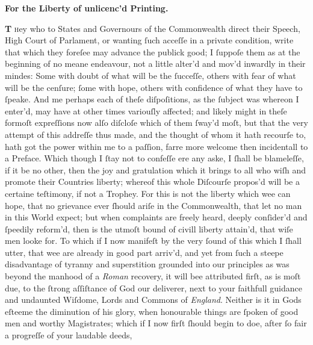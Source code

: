 \vspace*{\baselineskip}

\begin{center}
    \large\bfseries
    For the Liberty of unlicenc'd Printing.
\end{center}

\vspace{\baselineskip}

\lettrine[lines=3]{\bfseries T}{ h}ey who to States and Governours
of the Commonwealth direct their Speech, High Court of Parlament, or wanting
ſuch acceſſe in a private condition, write that which they foreſee may advance
the publick good; I ſuppoſe them as at the beginning of no meane endeavour, not
a little alter'd and mov'd inwardly in their mindes: Some with doubt of what
will be the ſucceſſe, others with fear of what will be the cenſure; ſome with
hope, others with confidence of what they have to ſpeake.  And me perhaps each
of theſe diſpoſitions, as the ſubject was whereon I enter'd, may have at other
times variouſly affected; and likely might in theſe formoſt expreſſions now alſo
diſcloſe which of them ſway'd moſt, but that the very attempt of this addreſſe
thus made, and the thought of whom it hath recourſe to, hath got the power
within me to a paſſion, farre more welcome then incidentall to a Preface.  Which
though I ſtay not to confeſſe ere any aske, I ſhall be blameleſſe, if it be no
other, then the joy and gratulation which it brings to all who wiſh and promote
their Countries liberty; whereof this whole Diſcourſe propos'd will be a
certaine teſtimony, if not a Trophey.  For this is not the liberty which wee can
hope, that no grievance ever ſhould ariſe in the Commonwealth, that let no man
in this World expect; but when complaints are freely heard, deeply conſider'd
and ſpeedily reform'd, then is the utmoſt bound of civill liberty attain'd, that
wiſe men looke for.  To which if I now manifeſt by the very ſound of this which
I ſhall utter, that wee are already in good part arriv'd, and yet from ſuch a
steepe disadvantage of tyranny and superstition grounded into our principles as
was beyond the manhood of a \textit{Roman} recovery, it will bee attributed
firſt, as is moſt due, to the ſtrong aſſiſtance of God our deliverer, next to
your faithfull guidance and undaunted Wiſdome, Lords and Commons of
\textit{England}.  Neither is it in Gods eſteeme the diminution of his glory,
when honourable things are ſpoken of good men and worthy Magistrates; which if I
now firſt ſhould begin to doe, after ſo fair a progreſſe of your laudable deeds,

